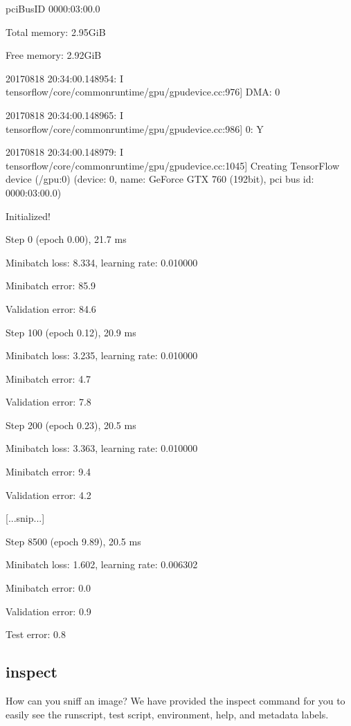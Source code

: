 \documentclass[letterpaper,10pt,english]{sphinxmanual}
\begin{document}
\begin{sphinxVerbatim}[commandchars=\\\{\}]
pciBusID 0000:03:00.0

Total memory: 2.95GiB

Free memory: 2.92GiB

2017\PYGZhy{}08\PYGZhy{}18 20:34:00.148954: I tensorflow/core/common\PYGZus{}runtime/gpu/gpu\PYGZus{}device.cc:976] DMA: 0

2017\PYGZhy{}08\PYGZhy{}18 20:34:00.148965: I tensorflow/core/common\PYGZus{}runtime/gpu/gpu\PYGZus{}device.cc:986] 0:   Y

2017\PYGZhy{}08\PYGZhy{}18 20:34:00.148979: I tensorflow/core/common\PYGZus{}runtime/gpu/gpu\PYGZus{}device.cc:1045] Creating TensorFlow device (/gpu:0) \PYGZhy{}\PYGZgt{} (device: 0, name: GeForce GTX 760 (192\PYGZhy{}bit), pci bus id: 0000:03:00.0)

Initialized!

Step 0 (epoch 0.00), 21.7 ms

Minibatch loss: 8.334, learning rate: 0.010000

Minibatch error: 85.9\PYGZpc{}

Validation error: 84.6\PYGZpc{}

Step 100 (epoch 0.12), 20.9 ms

Minibatch loss: 3.235, learning rate: 0.010000

Minibatch error: 4.7\PYGZpc{}

Validation error: 7.8\PYGZpc{}

Step 200 (epoch 0.23), 20.5 ms

Minibatch loss: 3.363, learning rate: 0.010000

Minibatch error: 9.4\PYGZpc{}

Validation error: 4.2\PYGZpc{}

[...snip...]

Step 8500 (epoch 9.89), 20.5 ms

Minibatch loss: 1.602, learning rate: 0.006302

Minibatch error: 0.0\PYGZpc{}

Validation error: 0.9\PYGZpc{}

Test error: 0.8\PYGZpc{}
\end{sphinxVerbatim}


\subsection{inspect}
\label{\detokenize{appendix:id29}}\label{\detokenize{appendix:sec-inspect}}
How can you sniff an image? We have provided the inspect command for
you to easily see the runscript, test script, environment, help, and
metadata labels.
\end{document}
